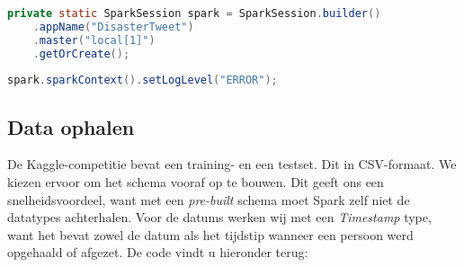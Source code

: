 \documentclass[a4paper,10pt,twoside]{report}
\begin{document}
\begin{lstlisting}[language=Java]
private static SparkSession spark = SparkSession.builder()
	.appName("DisasterTweet")
	.master("local[1]")
	.getOrCreate();
	
spark.sparkContext().setLogLevel("ERROR");
\end{lstlisting}

\newpage

\subsection*{Data ophalen}

De Kaggle-competitie bevat een training- en een testset. Dit in CSV-formaat. We kiezen ervoor om het schema vooraf op te bouwen. Dit geeft ons een snelheidsvoordeel, want met een \textit{pre-built} schema moet Spark zelf niet de datatypes achterhalen. Voor de datums werken wij met een \textit{Timestamp} type, want het bevat zowel de datum als het tijdstip wanneer een persoon werd opgehaald of afgezet. De code vindt u hieronder terug:
\end{document}
